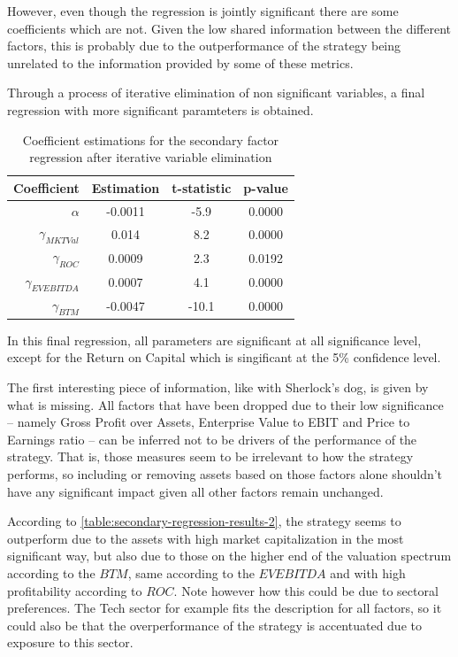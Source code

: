 However, even though the regression is jointly significant there are some coefficients which are not. Given the low shared information between the different factors, this is probably due to the outperformance of the strategy being unrelated to the information provided by some of these metrics. 

Through a process of iterative elimination of non significant variables, a final regression with more significant paramteters is obtained. 

\begin{table}[ht]
    \centering
    \begin{tabular}{rccc}
        \toprule
        Coefficient & Estimation & t-statistic & p-value \\ 
        \midrule
        $\alpha$ & -0.0011 & -5.9 & 0.0000 \\
        $\gamma_{MKTVal}$ & 0.014 & 8.2 & 0.0000 \\
        $\gamma_{ROC}$ & 0.0009 & 2.3 & 0.0192 \\
        $\gamma_{EVEBITDA}$ & 0.0007 & 4.1 & 0.0000 \\
        $\gamma_{BTM}$ & -0.0047 & -10.1 & 0.0000 \\
        \bottomrule
    \end{tabular}
    \captionsetup{justification=centering}
    \caption{Coefficient estimations for the secondary factor regression after iterative variable elimination}
    \label{table:secondary-regression-results-2}
\end{table}

In this final regression, all parameters are significant at all significance level, except for the Return on Capital which is singificant at the 5\% confidence level. 

The first interesting piece of information, like with Sherlock's dog, is given by what is missing. All factors that have been dropped due to their low significance -- namely Gross Profit over Assets, Enterprise Value to EBIT and Price to Earnings ratio -- can be inferred not to be drivers of the performance of the strategy. That is, those measures seem to be irrelevant to how the strategy performs, so including or removing assets based on those factors alone shouldn't have any significant impact given all other factors remain unchanged. 

According to \autoref{table:secondary-regression-results-2}, the strategy seems to outperform due to the assets with high market capitalization in the most significant way, but also due to those on the higher end of the valuation spectrum according to the $BTM$, same according to the $EVEBITDA$ and  with high profitability according to $ROC$. Note however how this could be due to sectoral preferences. The Tech sector for example fits the description for all factors, so it could also be that the overperformance of the strategy is accentuated due to exposure to this sector. 